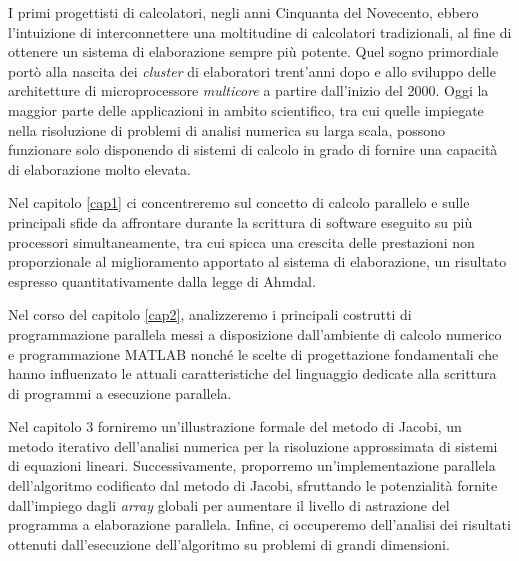 I primi progettisti di calcolatori, negli anni Cinquanta del Novecento, ebbero l'intuizione di interconnettere
una moltitudine di calcolatori tradizionali, al fine di ottenere un sistema di elaborazione sempre più potente.\newline
Quel sogno primordiale port\`o alla nascita dei \textit{cluster} di elaboratori trent'anni dopo e allo sviluppo delle architetture di microprocessore
\textit{multicore} a partire dall'inizio del 2000.\newline
Oggi la maggior parte delle applicazioni in ambito scientifico, tra cui quelle impiegate nella risoluzione di problemi di analisi numerica
su larga scala, possono funzionare solo disponendo di sistemi di calcolo in grado di fornire una capacit\`a di elaborazione molto elevata.

Nel capitolo \ref{cap1} ci concentreremo sul concetto di calcolo parallelo e sulle principali sfide da affrontare
durante la scrittura di software eseguito su pi\`u processori simultaneamente, tra cui spicca una crescita delle prestazioni non proporzionale
al miglioramento apportato al sistema di elaborazione, un risultato espresso quantitativamente dalla legge di Ahmdal.

Nel corso del capitolo \ref{cap2}, analizzeremo i principali costrutti di programmazione parallela messi a disposizione dall’ambiente di calcolo numerico
e programmazione MATLAB\textsuperscript{\textregistered} nonch\'e le scelte di progettazione fondamentali che hanno influenzato
le attuali caratteristiche del linguaggio dedicate alla scrittura di programmi a esecuzione parallela.

Nel capitolo 3 forniremo un'illustrazione formale del metodo di Jacobi, un metodo iterativo dell’analisi numerica per la risoluzione
approssimata di sistemi di equazioni lineari.\newline
Successivamente, proporremo un’implementazione parallela dell'algoritmo codificato dal metodo di Jacobi, sfruttando le potenzialità fornite
dall'impiego dagli \textit{array} globali per aumentare il livello di astrazione del programma a elaborazione parallela.\newline
Infine, ci occuperemo dell’analisi dei risultati ottenuti dall’esecuzione dell’algoritmo su problemi di grandi dimensioni.
